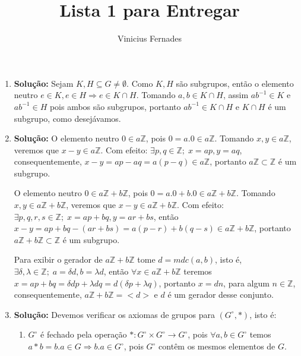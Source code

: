 \documentclass{article}
\begin{document}
	
\title{Lista 1 para Entregar}
\author{Vinicius Fernades}
	
\maketitle
	
\begin{enumerate}
	\item \textbf{Solução:} Sejam $K, H \subseteq G \neq \emptyset$. Como $K,H$ são subgrupos, então o elemento neutro $e \in K, e\in H \Rightarrow e \in K \cap H$. Tomando $a, b \in K \cap H$, assim $ab^{-1} \in K$ e $ab^{-1} \in H$ pois ambos são subgrupos, portanto $ab^{-1} \in K \cap H$ e $K \cap H$ é um subgrupo, como desejávamos.
	
	\item \textbf{Solução:} O elemento neutro $0 \in a\mathbb{Z}$, pois $0 = a.0 \in a\mathbb{Z}$. Tomando $x,y \in a\mathbb{Z}$, veremos que $x-y \in a\mathbb{Z}$. Com efeito: $\exists p,q \in \mathbb{Z}; \; x=ap, y=aq$, consequentemente, $x-y = ap - aq = a(p-q) \in a \mathbb{Z}$, portanto $a \mathbb{Z} \subset \mathbb{Z}$ é um subgrupo.
	
	O elemento neutro $0 \in a\mathbb{Z} + b\mathbb{Z}$, pois $0 = a.0 +b.0 \in a\mathbb{Z} + b\mathbb{Z}$. Tomando $x,y \in a\mathbb{Z} + b\mathbb{Z}$, veremos que  $x-y \in a\mathbb{Z} + b\mathbb{Z}$. Com efeito: $\exists p,q,r,s \in \mathbb{Z}; \; x=ap +bq, y=ar+bs$, então $x-y = ap +bq - (ar+bs) = a(p-r) + b(q-s) \in a\mathbb{Z} + b\mathbb{Z}$, portanto $a\mathbb{Z} + b\mathbb{Z} \subset \mathbb{Z}$ é um subgrupo. 
	
	Para exibir o gerador de $a\mathbb{Z} + b\mathbb{Z}$ tome $d = mdc(a, b)$, isto é, $\exists \delta, \lambda \in \mathbb{Z}; \; a = \delta d, b = \lambda d$, então $\forall x \in a\mathbb{Z} + b\mathbb{Z}$ teremos $x= ap+bq = \delta dp +\lambda dq = d(\delta p +\lambda q)$, portanto $x = dn$, para algum $n \in \mathbb{Z}$, consequentemente, $a\mathbb{Z} + b\mathbb{Z} = <d>$ e $d$ é um gerador desse conjunto.
	
	\item \textbf{Solução:} Devemos verificar os axiomas de grupos para $(G^{\circ},*)$, isto é:
		\begin{enumerate}
			\item $G^{\circ}$ é fechado pela operação $*: G^{\circ} \times G^{\circ} \to G^{\circ}$, pois $\forall a, b \in G^{\circ}$ temos $a*b = b.a \in G \Rightarrow b.a \in G^{\circ}$, pois $G^{\circ}$ contêm os mesmos elementos de $G$.
			

\end{enumerate}
\end{enumerate}
\end{document}
